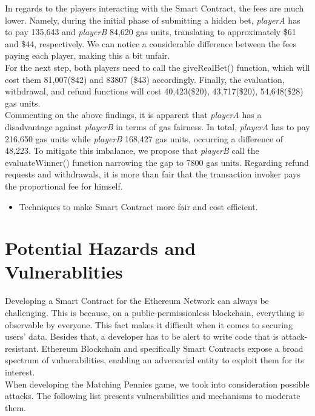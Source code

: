 \documentclass[12pt,a4paper]{article}
\begin{document}
In regards to the players interacting with the Smart Contract, the fees are much lower.
Namely, during the initial phase of submitting a hidden bet, \emph{playerA} has to pay 135,643
and \emph{playerB} 84,620 gas units, translating to approximately \$61 and \$44, respectively.
We can notice a considerable difference between the fees paying each player, making this a bit unfair. \\

For the next step, both players need to call the giveRealBet() function, which will cost
them 81,007(\$42) and  83807 (\$43) accordingly. Finally, the evaluation, withdrawal, and
refund functions will cost 40,423(\$20), 43,717(\$20), 54,648(\$28) gas units.  \\

Commenting on the above findings, it is apparent that \emph{playerA} has a disadvantage against \emph{playerB}
in terms of gas fairness. In total, \emph{playerA} has to pay 216,650 gas units while \emph{playerB} 168,427
gas units, occurring a difference of 48,223. To mitigate this imbalance, we propose that \emph{playerB}
call the evaluateWinner() function narrowing the gap to 7800 gas units. Regarding refund
requests and withdrawals, it is more than fair that the transaction invoker pays the proportional
fee for himself.

\begin{itemize}
        \item Techniques to make Smart Contract more fair and cost efficient.
\end{itemize}

\section*{Potential Hazards and Vulnerablities}

Developing a Smart Contract for the Ethereum Network can always be challenging.
This is because, on a public-permissionless blockchain, everything is observable by everyone.
This fact makes it difficult when it comes to securing users' data. Besides that, a developer
has to be alert to write code that is attack-resistant. Ethereum Blockchain and specifically
Smart Contracts expose a broad spectrum of vulnerabilities, enabling an adversarial entity to
exploit them for its interest. \\

When developing the Matching Pennies game, we took into consideration possible attacks.
The following list presents vulnerabilities and mechanisms to moderate them.
\end{document}
